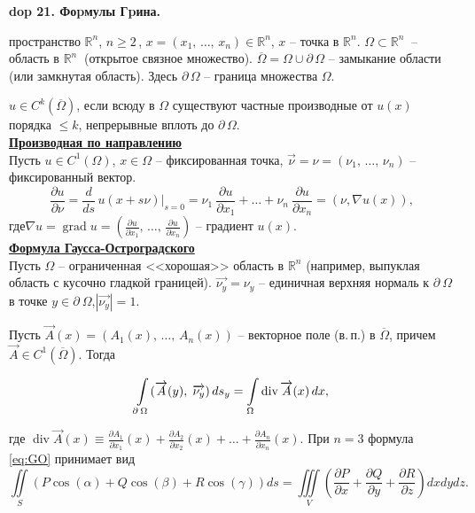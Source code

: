 \setcounter{section}{4}
\setcounter{subsection}{21}
\setcounter{equation}{0}
\textbf{\LARGE dop 21. Фоpмулы Гpина.}

 пространство $\mathbb{R}^n$,  \quad $n \geq 2$\,, \quad $x = (x_1,\,\ldots,\, x_n) \in \mathbb{R}^n$, \quad $x$ -- точка в $\mathbb{R}^n$. 
$\Omega\subset\mathbb{R}^n\:$ -- область в $\mathbb{R}^n\:$ (открытое связное множество). 
$\overline{\Omega} = \Omega \cup \partial\,\Omega$ -- замыкание области (или замкнутая область). Здесь $\partial\,\Omega$ -- граница множества $\Omega$.

 $u \in C^k(\overline{\Omega})$, если всюду в $\Omega$ существуют частные производные от $u(x)$ порядка $\leq k$, непрерывные вплоть до $\partial\,\Omega$.\\
\noindent\underline{\textbf{Производная по направлению}}\\
Пусть $u \in C^1(\Omega)$, \quad $x\in\Omega$ -- фиксированная точка, $\overrightarrow{\nu} = \nu = (\nu_1,\,\ldots,\, \nu_n)$ -- фиксированный вектор.
$$\frac{\partial u}{\partial \nu} = \frac{d}{ds}\,u(x+s\nu)\bigg|_{s=0} =
\nu_1 \: \frac{\partial u}{\partial x_1} + \ldots + \nu_n \: \frac{\partial u}{\partial x_n} = (\nu, \nabla u(x)),$$
где\quad$\nabla u = \displaystyle\operatorname{grad} u = \left(\frac{\partial u}{\partial x_1},\,\ldots,\, \frac{\partial u}{\partial x_n}\right)$ -- градиент $u(x).$ \\

\noindent\underline{\textbf{Формула Гаусса-Остроградского}}\\
Пусть $\Omega$ -- ограниченная <<хорошая>> область в $\mathbb{R}^n$ (например, выпуклая область с кусочно гладкой границей). 
$\overrightarrow{\nu_y} = \nu_y$ -- единичная верхняя нормаль к $\partial\:\Omega$ в точке $y\in\partial\:\Omega$,\quad$\displaystyle |\overrightarrow{\nu_y}| = 1$. 

\noindent Пусть $\overrightarrow{A}(x) = (A_1(x),\, \ldots,\, A_n(x))$ -- векторное поле (в.\,п.) в $\overline{\Omega}$, причем $\overrightarrow{A}\in C^1(\overline{\Omega})$.\;\; Тогда

\begin{equation}
\centering
    \int\limits_{\partial\:\Omega} (\overrightarrow{A}(y),\; \overrightarrow{\nu_y})\,ds_y = \int\limits_{\Omega}\operatorname{div}\overrightarrow{A}(x)\,dx, 
    \label{eq:GO}
\end{equation}

где \quad $\displaystyle \operatorname{div}\overrightarrow{A}(x) \equiv \frac{\partial A_1}{\partial x_1}(x)  + \frac{\partial A_2}{\partial x_2}(x) + \ldots + \frac{\partial A_n}{\partial x_n}(x) $. 
\newline\newline
\noindent{} При $n = 3$ формула \eqref{eq:GO} принимает вид
$$
    \iint\limits_S(P\cos(\alpha)+Q\cos(\beta)+R\cos(\gamma))ds = \iiint\limits_V \left(\frac{\partial P}{\partial x} + \frac{\partial Q}{\partial y}+\frac{\partial R}{\partial z}\right)dxdydz. 
$$

